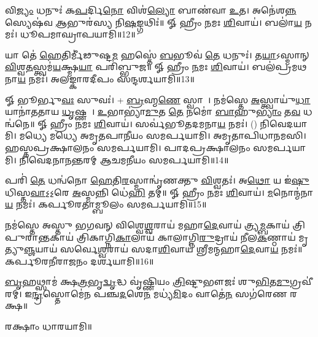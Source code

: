 𑌵𑌿\ul{𑌜𑍍𑌯𑌂} 𑌧𑌨𑍁𑌃॑ 𑌕\ul{𑌪}𑌰𑍍𑌦𑌿\ul{𑌨𑍋} 𑌵𑌿𑌶॑\ul{𑌲𑍍𑌯𑍋} 𑌬𑌾𑌣॑𑌵𑌾 \ul{𑌉}𑌤। 𑌅𑌨𑍇॑𑌶\ul{𑌨𑍍𑌨}\-𑌸𑍍𑌯𑍇𑌷॑𑌵 \ul{𑌆}𑌭𑍁𑌰॑𑌸𑍍𑌯 𑌨𑌿\ul{𑌷}𑌙𑍍𑌗𑌥𑌿𑌃॑॥ 𑍐 𑌹𑍍𑌰𑍀𑌂 \ul{𑌨}𑌮𑌃 \ul{𑌶𑌿}𑌵𑌾𑌯॑। 𑌬𑌲𑌾॑\ul{𑌯} 𑌨𑌮𑌃॑। 𑌧𑍂𑌪𑌮𑌾𑌘𑍍𑌰𑌾𑌪𑌯𑌾𑌮𑌿॥12॥

𑌯𑌾 𑌤𑍇॑ \ul{𑌹𑍇}𑌤𑌿𑌰𑍍𑌮𑍀॑𑌢𑍁𑌷𑍍𑌟\ul{𑌮} 𑌹𑌸𑍍𑌤𑍇॑ \ul{𑌬}𑌭𑍂𑌵॑ \ul{𑌤𑍇} 𑌧𑌨𑍁𑌃॑। 𑌤\ul{𑌯𑌾}𑌽𑌸𑍍𑌮𑌾𑌨𑍍 \ul{𑌵𑌿}𑌶𑍍𑌵\ul{𑌤}𑌸𑍍𑌤𑍍𑌵𑌮॑\ul{𑌯}𑌕𑍍𑌷𑍍𑌮\ul{𑌯𑌾} 𑌪𑌰𑌿॑𑌬𑍍𑌭𑍁𑌜॥ 𑍐 𑌹𑍍𑌰𑍀𑌂 \ul{𑌨}𑌮𑌃 \ul{𑌶𑌿}𑌵𑌾𑌯॑। 𑌬𑌲॑𑌪𑍍𑌰𑌮𑌥𑌨𑌾\ul{𑌯} 𑌨𑌮𑌃॑। 𑌅𑌲𑌙𑍍𑌕𑌾𑌰𑌦𑍀𑌪𑌂 𑌸𑌨𑍍𑌦𑌰𑍍𑌶𑌯𑌾𑌮𑌿॥13॥

𑍐 𑌭𑍂𑌰𑍍𑌭𑍁\ul{𑌵𑌃} 𑌸𑍁𑌵𑌃॑। + \ul{𑌬𑍍𑌰}𑌹𑍍𑌮\ul{𑌣𑍇} 𑌸𑍍𑌵𑌾𑌹𑌾᳚। 𑌨𑌮॑𑌸𑍍𑌤𑍇 \ul{𑌅}𑌸𑍍𑌤𑍍𑌵𑌾𑌯𑍁॑\ul{𑌧𑌾}𑌯𑌾𑌨𑌾॑𑌤𑌤𑌾𑌯 \ul{𑌧𑍃}𑌷𑍍𑌣𑌵𑍇᳚। \ul{𑌉}𑌭𑌾𑌭𑍍𑌯𑌾॑\ul{𑌮𑍁}𑌤 \ul{𑌤𑍇} 𑌨𑌮𑍋॑ \ul{𑌬𑌾}𑌹𑍁\ul{𑌭𑍍𑌯𑌾𑌂} 𑌤\ul{𑌵} 𑌧𑌨𑍍𑌵॑𑌨𑍇॥ 𑍐 𑌹𑍍𑌰𑍀𑌂 \ul{𑌨}𑌮𑌃 \ul{𑌶𑌿}𑌵𑌾𑌯॑। 𑌸𑌰𑍍𑌵॑𑌭𑍂𑌤𑌦𑌮𑌨𑌾\ul{𑌯} 𑌨𑌮𑌃॑। () 𑌨𑌿𑌵𑍇𑌦𑌯𑌾𑌮𑌿। 𑌮𑌧𑍍𑌯𑍇 𑌮𑌧𑍍𑌯𑍇 𑌅𑌮𑍃𑌤𑌪𑌾𑌨𑍀𑌯𑌂 𑌸𑌮𑌰𑍍𑌪𑌯𑌾𑌮𑌿। 𑌅𑌮𑍃𑌤𑌾𑌪𑌿𑌧𑌾𑌨𑌮𑌸𑌿।\\
𑌹𑌸𑍍𑌤𑌪𑍍𑌰𑌕𑍍𑌷𑌾𑌲𑌨𑌂 𑌸𑌮𑌰𑍍𑌪𑌯𑌾𑌮𑌿। 𑌪𑌾𑌦𑌪𑍍𑌰𑌕𑍍𑌷𑌾𑌲𑌨𑌂 𑌸𑌮𑌰𑍍𑌪𑌯𑌾𑌮𑌿। 𑌨𑌿𑌵𑍇𑌦𑌨𑌾𑌨𑌨𑍍𑌤𑌰𑌮𑍍 𑌆𑌚𑌮𑌨𑍀𑌯𑌂 𑌸𑌮𑌰𑍍𑌪𑌯𑌾𑌮𑌿॥14॥

𑌪𑌰𑌿॑ \ul{𑌤𑍇} 𑌧𑌨𑍍𑌵॑𑌨𑍋 \ul{𑌹𑍇}𑌤𑌿\ul{𑌰}𑌸𑍍𑌮𑌾𑌨𑍍𑌵𑍃॑𑌣𑌕𑍍𑌤𑍁 \ul{𑌵𑌿}𑌶𑍍𑌵𑌤𑌃॑। 𑌅\ul{𑌥𑍋} 𑌯 𑌇॑\ul{𑌷𑍁}𑌧𑌿𑌸𑍍𑌤\ul{𑌵𑌾}𑌽॒𑌽॒𑌰𑍇 \ul{𑌅}𑌸𑍍𑌮𑌨𑍍𑌨𑌿 𑌧𑍇॑\ul{𑌹𑌿} 𑌤𑌮𑍍॥ 𑍐 𑌹𑍍𑌰𑍀𑌂 \ul{𑌨}𑌮𑌃 \ul{𑌶𑌿}𑌵𑌾𑌯॑। \ul{𑌮}𑌨𑍋𑌨𑍍𑌮॑𑌨𑌾\ul{𑌯} 𑌨𑌮𑌃॑। 𑌕𑌰𑍍𑌪𑍂𑌰𑌤𑌾𑌮𑍍𑌬𑍂𑌲𑌂 𑌸𑌮𑌰𑍍𑌪𑌯𑌾𑌮𑌿॥15॥

𑌨𑌮॑𑌸𑍍𑌤𑍇 𑌅𑌸𑍍𑌤𑍁 𑌭𑌗𑌵𑌨𑍍 𑌵𑌿𑌶𑍍𑌵𑍇\ul{𑌶𑍍𑌵}𑌰𑌾𑌯॑ 𑌮𑌹𑌾\ul{𑌦𑍇}𑌵𑌾𑌯॑ 𑌤𑍍𑌰𑍍𑌯\ul{𑌮𑍍𑌬}𑌕𑌾𑌯॑ 𑌤𑍍𑌰𑌿𑌪𑍁𑌰𑌾\ul{𑌨𑍍𑌤}𑌕𑌾𑌯॑ 𑌤𑍍𑌰𑌿𑌕𑌾𑌗𑍍𑌨𑌿\ul{𑌕𑌾}𑌲𑌾𑌯॑ 𑌕𑌾𑌲𑌾𑌗𑍍𑌨𑌿\ul{𑌰𑍁}𑌦𑍍𑌰𑌾𑌯॑ 𑌨𑍀𑌲\ul{𑌕}𑌣𑍍𑌠𑌾𑌯॑ 𑌮𑍃𑌤𑍍𑌯𑍁\ul{𑌞𑍍𑌜}𑌯𑌾𑌯॑ 𑌸𑌰𑍍𑌵𑍇\ul{𑌶𑍍𑌵}𑌰𑌾𑌯॑ 𑌸𑌦𑌾\ul{𑌶𑌿}𑌵𑌾𑌯॑ 𑌶𑍍𑌰𑍀𑌮𑌨𑍍𑌮𑌹𑌾\ul{𑌦𑍇}𑌵𑌾\ul{𑌯} 𑌨𑌮𑌃॑॥ 𑌕𑌰𑍍𑌪𑍂𑌰𑌨𑍀𑌰𑌾𑌜𑌨𑌂 𑌦𑌰𑍍𑌶𑌯𑌾𑌮𑌿॥16॥

\ul{𑌬𑍃}𑌹𑌥𑍍𑌸𑌾𑌮॑ 𑌕𑍍𑌷\ul{𑌤𑍍𑌰}𑌭𑍃\ul{𑌦𑍍𑌵𑍃}𑌦𑍍𑌧 𑌵𑍃॑𑌷𑍍𑌣𑌿𑌯𑌂 \ul{𑌤𑍍𑌰𑌿}𑌷𑍍𑌟𑍁𑌭𑍗𑌜𑌃॑ 𑌶𑍁\ul{𑌭𑌿}𑌤\ul{𑌮𑍁}𑌗𑍍𑌰𑌵𑍀॑𑌰𑌮𑍍।
𑌇\ul{𑌨𑍍𑌦𑍍𑌰}𑌸𑍍𑌤𑍋𑌮𑍇॑𑌨 𑌪𑌞𑍍𑌚\ul{𑌦}𑌶𑍇\ul{𑌨} 𑌮𑌧𑍍𑌯॑\ul{𑌮𑌿}𑌦𑌂 𑌵𑌾𑌤𑍇॑\ul{𑌨} 𑌸𑌗॑𑌰𑍇𑌣 𑌰𑌕𑍍𑌷॥

𑌰𑌕𑍍𑌷𑌾𑌂 𑌧𑌾𑌰𑌯𑌾𑌮𑌿॥


{\small \closesection}


